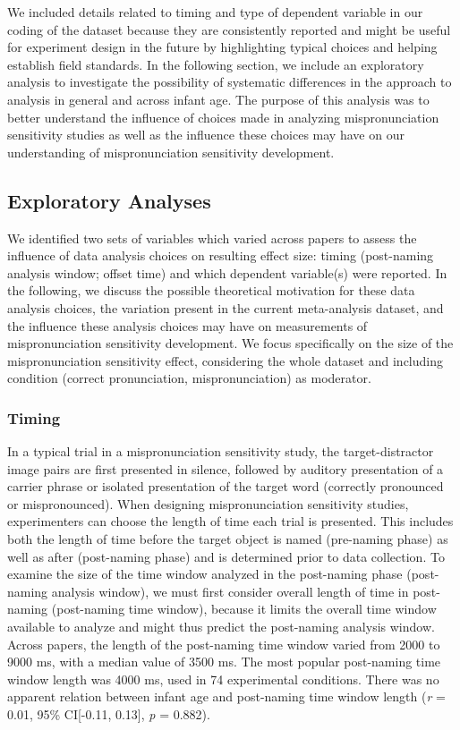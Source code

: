 \documentclass[man]{apa6}
\begin{document}
We included details related to timing and type of dependent variable in our coding of the dataset because they are consistently reported and might be useful for experiment design in the future by highlighting typical choices and helping establish field standards. In the following section, we include an exploratory analysis to investigate the possibility of systematic differences in the approach to analysis in general and across infant age. The purpose of this analysis was to better understand the influence of choices made in analyzing mispronunciation sensitivity studies as well as the influence these choices may have on our understanding of mispronunciation sensitivity development.

\hypertarget{exploratory-analyses}{%
\subsection{Exploratory Analyses}\label{exploratory-analyses}}

We identified two sets of variables which varied across papers to assess the influence of data analysis choices on resulting effect size: timing (post-naming analysis window; offset time) and which dependent variable(s) were reported. In the following, we discuss the possible theoretical motivation for these data analysis choices, the variation present in the current meta-analysis dataset, and the influence these analysis choices may have on measurements of mispronunciation sensitivity development. We focus specifically on the size of the mispronunciation sensitivity effect, considering the whole dataset and including condition (correct pronunciation, mispronunciation) as moderator.

\hypertarget{timing}{%
\subsubsection{Timing}\label{timing}}

In a typical trial in a mispronunciation sensitivity study, the target-distractor image pairs are first presented in silence, followed by auditory presentation of a carrier phrase or isolated presentation of the target word (correctly pronounced or mispronounced). When designing mispronunciation sensitivity studies, experimenters can choose the length of time each trial is presented. This includes both the length of time before the target object is named (pre-naming phase) as well as after (post-naming phase) and is determined prior to data collection. To examine the size of the time window analyzed in the post-naming phase (post-naming analysis window), we must first consider overall length of time in post-naming (post-naming time window), because it limits the overall time window available to analyze and might thus predict the post-naming analysis window. Across papers, the length of the post-naming time window varied from 2000 to 9000 ms, with a median value of 3500 ms. The most popular post-naming time window length was 4000 ms, used in 74 experimental conditions. There was no apparent relation between infant age and post-naming time window length (\emph{r} = 0.01, 95\% CI{[}-0.11, 0.13{]}, \emph{p} = 0.882).
\end{document}
